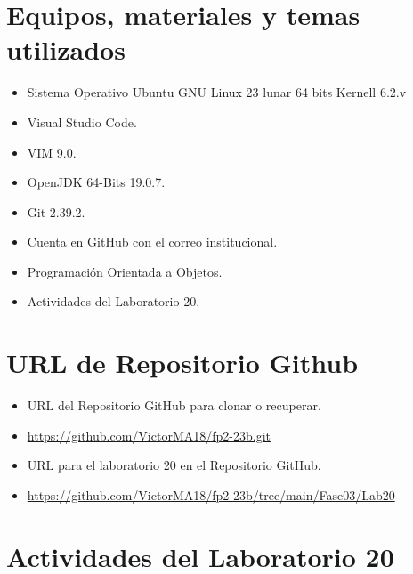 \documentclass{article}
\begin{document}
	\section{Equipos, materiales y temas utilizados}
	\begin{itemize}
		\item Sistema Operativo Ubuntu GNU Linux 23 lunar 64 bits Kernell 6.2.v
		\item Visual Studio Code.
		\item VIM 9.0.
		\item OpenJDK 64-Bits 19.0.7.
		\item Git 2.39.2.
		\item Cuenta en GitHub con el correo institucional.
		\item Programación Orientada a Objetos.
		\item Actividades del Laboratorio 20.	
	\end{itemize}
	
	\section{URL de Repositorio Github}
	\begin{itemize}
		\item URL del Repositorio GitHub para clonar o recuperar.
		\item \url{https://github.com/VictorMA18/fp2-23b.git}
		\item URL para el laboratorio 20 en el Repositorio GitHub.
		\item \url{https://github.com/VictorMA18/fp2-23b/tree/main/Fase03/Lab20}
	\end{itemize}
	
	\section{Actividades del Laboratorio 20}
\end{document}
